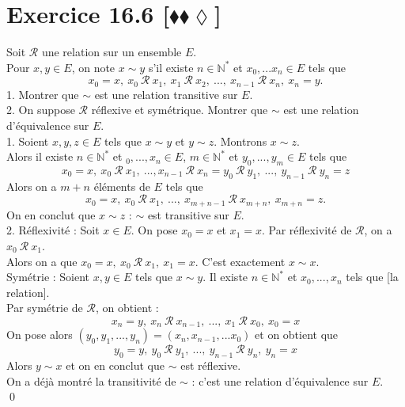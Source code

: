 \documentclass[10pt]{article}
\begin{document}
\section*{Exercice 16.6 [$\blacklozenge\blacklozenge\lozenge$]}
\begin{tcolorbox}[enhanced, width=7.6in, center, size=fbox, fontupper=\large, drop shadow southwest]
    Soit $\mathcal{R}$ une relation sur un ensemble $E$.\\
    Pour $x,y\in E$, on note $x \sim y$ s'il existe $n\in\mathbb{N}^*$ et $x_0,...x_n \in E$ tels que
    \begin{equation*}
        x_0 = x, ~ x_0 ~ \mathcal{R} ~ x_1, ~ x_1 ~ \mathcal{R} ~ x_2, ~ ..., ~ x_{n-1} ~ \mathcal{R} ~ x_n, ~ x_n = y.
    \end{equation*}
    1. Montrer que $\sim$ est une relation transitive sur $E$.\\
    2. On suppose $\mathcal{R}$ réflexive et symétrique. Montrer que $\sim$ est une relation d'équivalence sur $E$.\\[0.2cm]
    1. Soient $x,y,z\in E$ tels que $x \sim y$ et $y \sim z$. Montrons $x \sim z$.\\
    Alors il existe $n \in \mathbb{N}^*$ et $_0,...,x_n\in E$, $m \in \mathbb{N}^*$ et $y_0,...,y_m\in E$ tels que
    \begin{equation*}
        x_0 = x, ~ x_0 ~ \mathcal{R} ~ x_1, ~..., x_{n-1} ~ \mathcal{R} ~ x_n = y_0 ~ \mathcal{R} ~ y_1, ~...,~y_{n-1} ~ \mathcal{R} ~y_n=z
    \end{equation*}
    Alors on a $m+n$ éléments de $E$ tels que
    \begin{equation*}
        x_0 = x, ~ x_0 ~ \mathcal{R} ~ x_1, ~ ..., ~ x_{m+n-1} ~ \mathcal{R} ~x_{m+n}, ~ x_{m+n} = z. 
    \end{equation*}
    On en conclut que $x \sim z$ : $\sim$ est transitive sur $E$.\\[0.15cm]
    2. Réflexivité : Soit $x \in E$. On pose $x_0 = x$ et $x_1 = x$. Par réflexivité de $\mathcal{R}$, on a $x_0 ~ \mathcal{R} ~ x_1$.\\
    Alors on a que $x_0 = x, ~ x_0 ~ \mathcal{R} ~ x_1, ~ x_1 = x$. C'est exactement $x \sim x$.\\[0.15cm]
    Symétrie : Soient $x,y\in E$ tels que $x \sim y$. Il existe $n\in\mathbb{N}^*$ et $x_0,...,x_n$ tels que [la relation].\\
    Par symétrie de $\mathcal{R}$, on obtient :
    \begin{equation*}
        x_n = y, ~ x_{n} ~ \mathcal{R} ~ x_{n-1}, ~ ..., ~ x_1 ~ \mathcal{R} ~ x_0, ~ x_0 = x 
    \end{equation*}
    On pose alors $(y_0, y_1, ..., y_n) = (x_n, x_{n-1}, ... x_0)$ et on obtient que
    \begin{equation*}
        y_0 = y, ~ y_0 ~ \mathcal{R} ~ y_{1}, ~ ..., ~ y_{n-1} ~ \mathcal{R} ~ y_n, ~ y_n = x
    \end{equation*}
    Alors $y \sim x$ et on en conclut que $\sim$ est réflexive.\\
    On a déjà montré la transitivité de $\sim$ : c'est une relation d'équivalence sur $E$.\\
    \qed
\end{tcolorbox}
\end{document}
